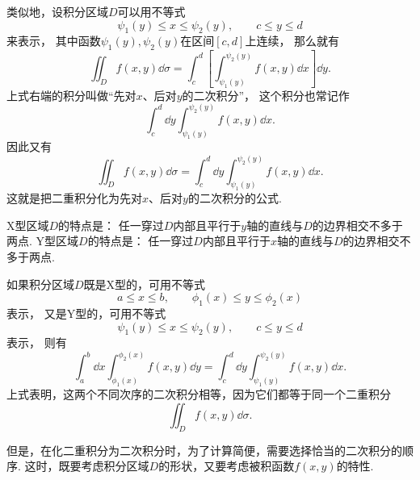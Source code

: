 \begin{figure}[htb]
	\centering
	\caption{}
	\label{figure:二重积分.X型区域}
\end{figure}

类似地，设积分区域\(D\)可以用不等式\[
	\psi_1(y) \leq x \leq \psi_2(y), \qquad
	c \leq y \leq d
\]来表示，
其中函数\(\psi_1(y),\psi_2(y)\)在区间\([c,d]\)上连续，
那么就有\[
	\iint_D f(x,y) \dd{\sigma}
	= \int_c^d \left[ \int_{\psi_1(y)}^{\psi_2(y)} f(x,y) \dd{x} \right] \dd{y}.
\]
上式右端的积分叫做“先对\(x\)、后对\(y\)的二次积分”，
这个积分也常记作\[
	\int_c^d \dd{y} \int_{\psi_1(y)}^{\psi_2(y)} f(x,y) \dd{x}.
\]
因此又有\[
	\iint_D f(x,y) \dd{\sigma}
	= \int_c^d \dd{y} \int_{\psi_1(y)}^{\psi_2(y)} f(x,y) \dd{x}.
\]
这就是把二重积分化为先对\(x\)、后对\(y\)的二次积分的公式.

X型区域\(D\)的特点是：
任一穿过\(D\)内部且平行于\(y\)轴的直线与\(D\)的边界相交不多于两点.
Y型区域\(D\)的特点是：
任一穿过\(D\)内部且平行于\(x\)轴的直线与\(D\)的边界相交不多于两点.

如果积分区域\(D\)既是X型的，可用不等式\[
	a \leq x \leq b, \qquad
	\phi_1(x) \leq y \leq \phi_2(x)
\]表示，
又是Y型的，可用不等式\[
	\psi_1(y) \leq x \leq \psi_2(y), \qquad
	c \leq y \leq d
\]表示，
则有\[
	\int_a^b \dd{x}
	\int_{\phi_1(x)}^{\phi_2(x)} f(x,y) \dd{y}
	=\int_c^d \dd{y}
	\int_{\psi_1(y)}^{\psi_2(y)} f(x,y) \dd{x}.
\]
上式表明，这两个不同次序的二次积分相等，因为它们都等于同一个二重积分\[
	\iint_D f(x,y) \dd{\sigma}.
\]

但是，在化二重积分为二次积分时，为了计算简便，需要选择恰当的二次积分的顺序.
这时，既要考虑积分区域\(D\)的形状，又要考虑被积函数\(f(x,y)\)的特性.

